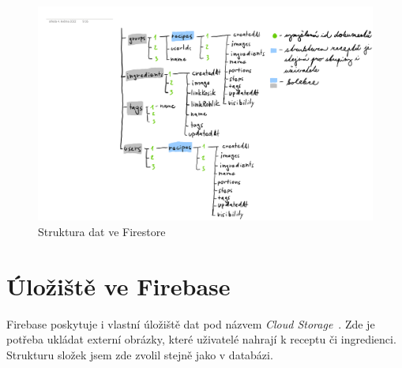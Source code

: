 \begin{figure}[H]
    \includegraphics[width=\textwidth]{pdf/navrh-firestore}
    \caption{Struktura dat ve Firestore} \label{picture:recipeo:firestore-structure}
\end{figure}


\section{Úložiště ve Firebase}
Firebase poskytuje i vlastní úložiště dat pod názvem \emph{Cloud Storage}~\cite{CloudStorage}. Zde je potřeba ukládat externí obrázky, které uživatelé
nahrají k receptu či ingredienci. Strukturu složek jsem zde zvolil stejně jako v databázi.

